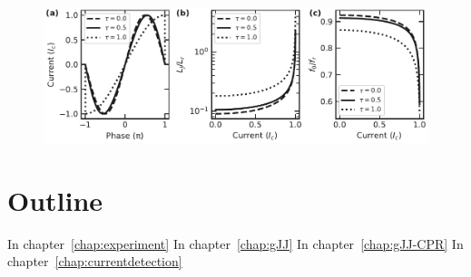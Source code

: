 \begin{figure}
	\centering
	\includegraphics[width=\linewidth]{chapter-gJJ-CPR/figs/SMFigure-influence}
	\caption{}
	\label{fig:smfigure-influence}
\end{figure}


\section{Outline}
In chapter~\ref{chap:experiment}
%
In chapter~\ref{chap:gJJ}
%
In chapter~\ref{chap:gJJ-CPR}
%
In chapter~\ref{chap:currentdetection}
%


